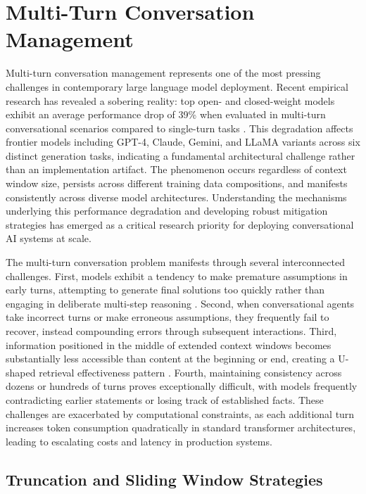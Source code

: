 \section{Multi-Turn Conversation Management}
\label{sec:multiturn}

Multi-turn conversation management represents one of the most pressing challenges in contemporary large language model deployment. Recent empirical research has revealed a sobering reality: top open- and closed-weight models exhibit an average performance drop of 39\% when evaluated in multi-turn conversational scenarios compared to single-turn tasks \citep{wang2025survey}. This degradation affects frontier models including GPT-4, Claude, Gemini, and LLaMA variants across six distinct generation tasks, indicating a fundamental architectural challenge rather than an implementation artifact. The phenomenon occurs regardless of context window size, persists across different training data compositions, and manifests consistently across diverse model architectures. Understanding the mechanisms underlying this performance degradation and developing robust mitigation strategies has emerged as a critical research priority for deploying conversational AI systems at scale.

The multi-turn conversation problem manifests through several interconnected challenges. First, models exhibit a tendency to make premature assumptions in early turns, attempting to generate final solutions too quickly rather than engaging in deliberate multi-step reasoning \citep{wang2025survey}. Second, when conversational agents take incorrect turns or make erroneous assumptions, they frequently fail to recover, instead compounding errors through subsequent interactions. Third, information positioned in the middle of extended context windows becomes substantially less accessible than content at the beginning or end, creating a U-shaped retrieval effectiveness pattern \citep{liu2024lost}. Fourth, maintaining consistency across dozens or hundreds of turns proves exceptionally difficult, with models frequently contradicting earlier statements or losing track of established facts. These challenges are exacerbated by computational constraints, as each additional turn increases token consumption quadratically in standard transformer architectures, leading to escalating costs and latency in production systems.

\subsection{Truncation and Sliding Window Strategies}

